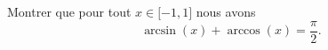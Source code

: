 
\begin{exercice}\label{exoanalyseCTU-0004}

    Montrer que pour tout \( x\in\mathopen[ -1 , 1 \mathclose]\) nous avons
    \begin{equation}
        \arcsin(x)+\arccos(x)=\frac{ \pi }{2}.
    \end{equation}

\end{exercice}
